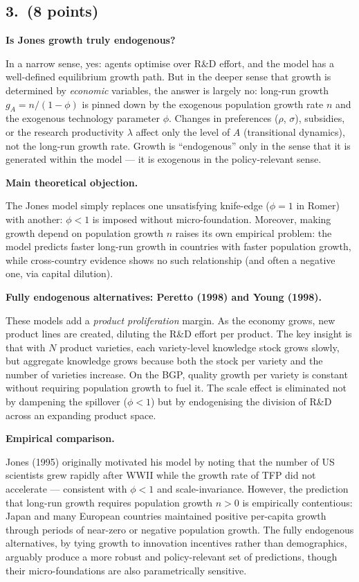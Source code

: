 \documentclass[a4paper,11pt]{article}
\begin{document}
\subsection*{3.\ (8 points)}

\begin{answerbox}
\textbf{Is Jones growth truly endogenous?}

In a narrow sense, yes: agents optimise over R\&D effort, and the model has a well-defined equilibrium growth path.  But in the deeper sense that growth is determined by \emph{economic} variables, the answer is largely no: long-run growth $g_A = n/(1-\phi)$ is pinned down by the exogenous population growth rate $n$ and the exogenous technology parameter $\phi$.  Changes in preferences ($\rho$, $\sigma$), subsidies, or the research productivity $\lambda$ affect only the level of $A$ (transitional dynamics), not the long-run growth rate.  Growth is ``endogenous'' only in the sense that it is generated within the model --- it is exogenous in the policy-relevant sense.

\textbf{Main theoretical objection.}

The Jones model simply replaces one unsatisfying knife-edge ($\phi = 1$ in Romer) with another: $\phi < 1$ is imposed without micro-foundation.  Moreover, making growth depend on population growth $n$ raises its own empirical problem: the model predicts faster long-run growth in countries with faster population growth, while cross-country evidence shows no such relationship (and often a negative one, via capital dilution).

\textbf{Fully endogenous alternatives: Peretto (1998) and Young (1998).}

These models add a \emph{product proliferation} margin.  As the economy grows, new product lines are created, diluting the R\&D effort per product.  The key insight is that with $N$ product varieties, each variety-level knowledge stock grows slowly, but aggregate knowledge grows because both the stock per variety and the number of varieties increase.  On the BGP, quality growth per variety is constant without requiring population growth to fuel it.  The scale effect is eliminated not by dampening the spillover ($\phi < 1$) but by endogenising the division of R\&D across an expanding product space.

\textbf{Empirical comparison.}

Jones (1995) originally motivated his model by noting that the number of US scientists grew rapidly after WWII while the growth rate of TFP did not accelerate --- consistent with $\phi < 1$ and scale-invariance.  However, the prediction that long-run growth requires population growth $n > 0$ is empirically contentious: Japan and many European countries maintained positive per-capita growth through periods of near-zero or negative population growth.  The fully endogenous alternatives, by tying growth to innovation incentives rather than demographics, arguably produce a more robust and policy-relevant set of predictions, though their micro-foundations are also parametrically sensitive.
\end{answerbox}
\end{document}
